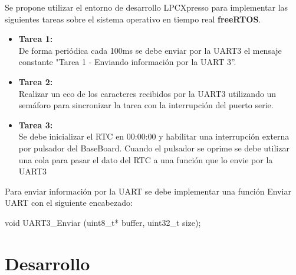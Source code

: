 \documentclass[a4paper,12pt]{article}
\begin{document}
Se propone utilizar el entorno de desarrollo LPCXpresso para implementar las siguientes tareas sobre el sistema operativo en tiempo real \textbf{freeRTOS}.

\begin{itemize}
\item \textbf{Tarea 1:}\\
De forma periódica cada 100ms se debe enviar por la UART3 el mensaje constante "Tarea 1 - Enviando información por la UART 3”.
\item \textbf{Tarea 2:}\\
Realizar un eco de los caracteres recibidos por la UART3 utilizando un semáforo para sincronizar la tarea  con la interrupción del puerto serie.
\item \textbf{Tarea 3:}\\
Se debe inicializar el RTC en 00:00:00 y habilitar una interrupción externa por pulsador del BaseBoard. Cuando el pulsador se oprime se debe utilizar una cola para pasar el dato del RTC a una función que lo envie por la UART3
\end{itemize}

Para enviar información por la UART se debe implementar una función Enviar UART con el siguiente encabezado:

\begin{center}
void UART3\_Enviar (uint8\_t* buffer, uint32\_t size);
\end{center}

\section{Desarrollo}
\end{document}
